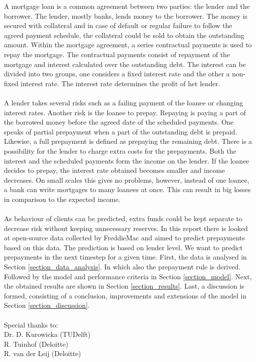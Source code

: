 A mortgage loan is a common agreement between two parties: the lender and the borrower. 
The lender, mostly banks, lends money to the borrower. The money is 
secured with collateral and in case of default or regular failure to follow 
the agreed payment schedule, the collateral could be sold to obtain the outstanding amount. Within the mortgage 
agreement, a series contractual payments is used to repay the mortgage. 
The contractual payments consist of repayment of the 
mortgage and interest calculated over the outstanding debt. 
The interest can be divided into two groups, one considers a 
fixed interest rate and the other a non-fixed interest rate. The 
interest rate determines the profit of het lender. 
\\\\
A lender takes several risks such as a failing payment of the loanee or 
changing interest rates. Another risk is the loanee to prepay. Repaying 
is paying a part of the borrowed money before the agreed date of the 
scheduled payments. One speaks of partial prepayment when a part of 
the outstanding debt is prepaid. Likewise, a full prepayment is defined 
as prepaying the remaining debt. There is a possibility for the lender 
to charge extra costs for the prepayments. Both the interest and the 
scheduled payments form the income on the lender. If the loanee decides 
to prepay, the interest rate obtained becomes smaller and income 
decreases.  On small scales this gives no problems, however, instead 
of one loanee, a bank can write mortgages to many loanees at once. 
This can result in big losses in comparison to the expected income.  
\\\\
As behaviour of clients can be predicted, extra funds could be kept 
separate to decrease risk without keeping unnecessary reserves. In this 
report there is looked at open-source data collected by FreddieMac and 
aimed to predict prepayments based on this data. The prediction is 
based on lender level. We want to predict prepayments in the next 
timestep for a given time. First, the data is analysed in Section 
\ref{section_data_analysis}. In which also the prepayment rule is 
derived. Followed by the model and performance criteria in Section 
\ref{section_model}. Next, the obtained results are shown in 
Section \ref{section_results}. Last, a discussion is formed, 
consisting of a conclusion, improvements and extensions of the model 
in Section \ref{section_discussion}.
\\\\
Special thanks to:\\
Dr. D. Kurowicka (TUDelft)\\
R. Tuinhof (Deloitte)\\
R. van der Leij (Deloitte)
